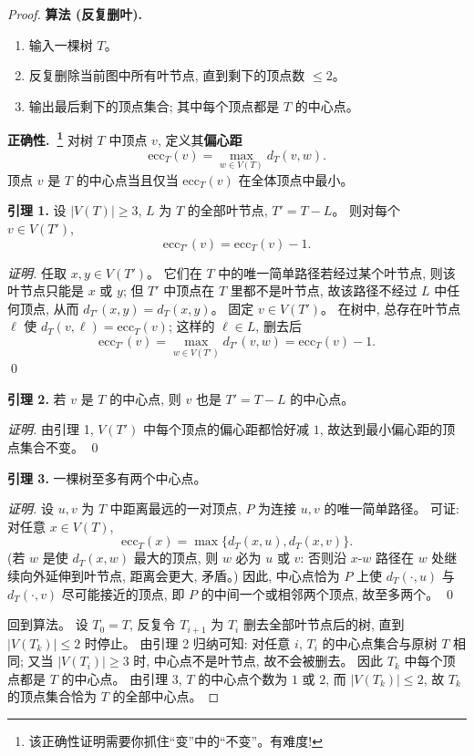 \documentclass[a4paper, justified]{tufte-handout}
\begin{document}
\begin{proof}
  \textbf{算法 (反复删叶).}
  \begin{enumerate}[(1)]
    \item 输入一棵树 $T$。
    \item 反复删除当前图中所有叶节点, 直到剩下的顶点数 $\le 2$。
    \item 输出最后剩下的顶点集合; 其中每个顶点都是 $T$ 的中心点。
  \end{enumerate}

  \textbf{正确性.~\footnote{
    该正确性证明需要你抓住``变''中的``不变''。有难度!
  }}
  对树 $T$ 中顶点 $v$, 定义其\textbf{偏心距}
  \[
    \mathrm{ecc}_T(v) = \max_{w \in V(T)} d_T(v, w).
  \]
  顶点 $v$ 是 $T$ 的中心点当且仅当 $\mathrm{ecc}_T(v)$ 在全体顶点中最小。

  \textbf{引理 1.}
  设 $|V(T)| \ge 3$, $L$ 为 $T$ 的全部叶节点, $T' = T - L$。
  则对每个 $v \in V(T')$,
  \[
    \mathrm{ecc}_{T'}(v) = \mathrm{ecc}_T(v) - 1.
  \]

  \textit{证明.}
  任取 $x, y \in V(T')$。
  它们在 $T$ 中的唯一简单路径若经过某个叶节点, 则该叶节点只能是 $x$ 或 $y$;
  但 $T'$ 中顶点在 $T$ 里都不是叶节点, 故该路径不经过 $L$ 中任何顶点,
  从而 $d_{T'}(x, y) = d_T(x, y)$。
  固定 $v \in V(T')$。
  在树中, 总存在叶节点 $\ell$ 使 $d_T(v, \ell) = \mathrm{ecc}_T(v)$;
  这样的 $\ell \in L$, 删去后
  \[
    \mathrm{ecc}_{T'}(v) = \max_{w \in V(T')} d_{T'}(v, w)
    = \mathrm{ecc}_T(v) - 1.
  \]
  \qed

  \textbf{引理 2.}
  若 $v$ 是 $T$ 的中心点, 则 $v$ 也是 $T' = T - L$ 的中心点。

  \textit{证明.}
  由引理 1, $V(T')$ 中每个顶点的偏心距都恰好减 $1$,
  故达到最小偏心距的顶点集合不变。
  \qed

  \textbf{引理 3.}
  一棵树至多有两个中心点。

  \textit{证明.}
  设 $u, v$ 为 $T$ 中距离最远的一对顶点, $P$ 为连接 $u, v$ 的唯一简单路径。
  可证: 对任意 $x \in V(T)$,
  \[
    \mathrm{ecc}_T(x) = \max\{d_T(x, u), d_T(x, v)\}.
  \]
  (若 $w$ 是使 $d_T(x, w)$ 最大的顶点, 则 $w$ 必为 $u$ 或 $v$:
  否则沿 $x$-$w$ 路径在 $w$ 处继续向外延伸到叶节点, 距离会更大, 矛盾。)
  因此, 中心点恰为 $P$ 上使 $d_T(\cdot, u)$ 与 $d_T(\cdot, v)$ 尽可能接近的顶点,
  即 $P$ 的中间一个或相邻两个顶点, 故至多两个。
  \qed

  回到算法。
  设 $T_0 = T$, 反复令 $T_{i+1}$ 为 $T_i$ 删去全部叶节点后的树,
  直到 $|V(T_k)| \le 2$ 时停止。
  由引理 2 归纳可知: 对任意 $i$, $T_i$ 的中心点集合与原树 $T$ 相同;
  又当 $|V(T_i)| \ge 3$ 时, 中心点不是叶节点, 故不会被删去。
  因此 $T_k$ 中每个顶点都是 $T$ 的中心点。
  由引理 3, $T$ 的中心点个数为 $1$ 或 $2$,
  而 $|V(T_k)| \le 2$, 故 $T_k$ 的顶点集合恰为 $T$ 的全部中心点。
\end{proof}
\end{document}
